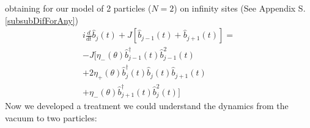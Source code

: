 \documentclass[a4paper, amsfonts, amssymb, amsmath, reprint, showkeys, nofootinbib ,twoside]{revtex4-2}
\begin{document}
 obtaining for our model of 2 particles ($N=2$) on infinity sites (See Appendix S.\ref{subsubDifForAny}) 
\begin{equation}\label{Eq:DiffEqFo2Anyons}
\begin{split}
i\frac{d}{dt}\hat{b}_j(t) + J\left[\hat{b}_{j-1}(t) + \hat{b}_{j+1}(t)\right] = \\
-J\Big[ \eta_-(\theta)\hat{b}_{j-1}^\dagger(t)\hat{b}_{j-1}^2(t) \\ 
+ 2\eta_+(\theta)\hat{b}_j^\dagger(t)\hat{b}_j(t)\hat{b}_{j+1}(t) \\
 + \eta_-(\theta)\hat{b}_{j+1}^\dagger(t)\hat{b}_j^2(t) \Big]
\end{split}  
\end{equation} 
Now we developed a treatment we could understand the dynamics from the vacuum to two particles: 


\onecolumngrid
\end{document}
